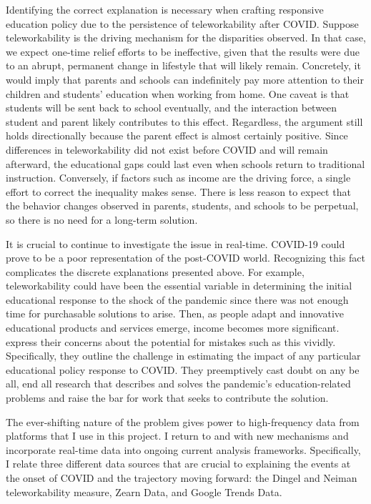Identifying the correct explanation is necessary when crafting responsive education policy due to the persistence of teleworkability after COVID.
Suppose teleworkability is the driving mechanism for the disparities observed.
In that case, we expect one-time relief efforts to be ineffective, given that the results were due to an abrupt, permanent change in lifestyle that will likely remain.
Concretely, it would imply that parents and schools can indefinitely pay more attention to their children and students’ education when working from home.
One caveat is that students will be sent back to school eventually,
and the interaction between student and parent likely contributes to this effect.
Regardless, the argument still holds directionally because the parent effect is almost certainly positive.
Since differences in teleworkability did not exist before COVID and will remain afterward, the educational gaps could last even when schools return to traditional instruction.
Conversely, if factors such as income are the driving force, a single effort to correct the inequality makes sense.
There is less reason to expect that the behavior changes observed in parents, students, and schools to be perpetual, so there is no need for a long-term solution.

It is crucial to continue to investigate the issue in real-time.
COVID-19 could prove to be a poor representation of the post-COVID world.
Recognizing this fact complicates the discrete explanations presented above.
For example, teleworkability could have been the essential variable in determining the initial educational response to the shock of the pandemic since there was not enough time for purchasable solutions to arise.
Then, as people adapt and innovative educational products and services emerge, income becomes more significant.
\cite{bh2} express their concerns about the potential for mistakes such as this vividly.
Specifically, they outline the challenge in estimating the impact of any particular educational policy response to COVID.
They preemptively cast doubt on any be all, end all research that describes and solves the pandemic’s education-related problems and raise the bar for work that seeks to contribute the solution.

The ever-shifting nature of the problem gives power to high-frequency data from platforms that I use in this project.
I return to \citep{bh1} and \citep{chetty} with new mechanisms and incorporate real-time data into ongoing current analysis frameworks.
Specifically, I relate three different data sources that are crucial to explaining the events at the onset of COVID and the trajectory moving forward: the Dingel and Neiman teleworkability measure, Zearn Data, and Google Trends Data.
